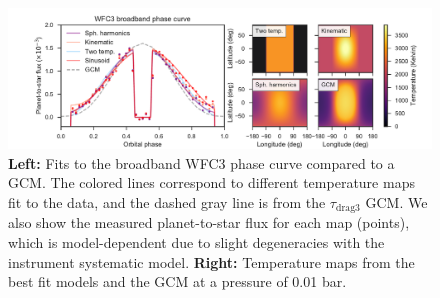 \documentclass[twocolumn]{aastex61}
\begin{document}
\begin{figure}
\includegraphics[width = 1.0\textwidth, trim={1.5cm 0 0.5cm 0},clip]{Figures/hst_model_comparison.pdf}
\caption{\textbf{Left:} Fits to the broadband WFC3 phase curve compared to a GCM. The colored lines correspond to different temperature maps fit to the data, and the dashed gray line is from the $\tau_\mathrm{drag3}$ GCM. We also show the measured planet-to-star flux for each map (points), which is model-dependent due to slight degeneracies with the instrument systematic model.  \textbf{Right:} Temperature maps from the best fit models and the GCM at a pressure of 0.01 bar.}
\label{fig:model_comparison}
\end{figure}
\end{document}
